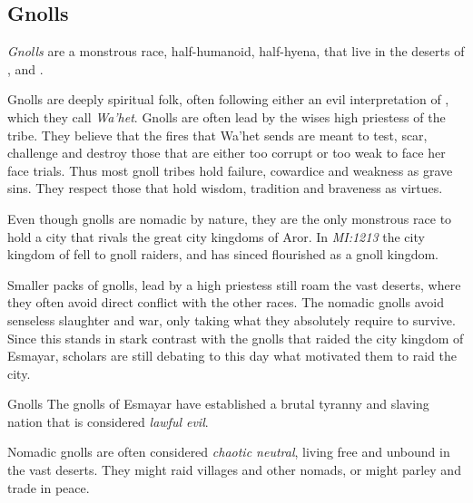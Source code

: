 \subsection{Gnolls}
\label{sec:Gnolls}

\emph{Gnolls} are a monstrous race, half-humanoid, half-hyena, that live in the
deserts of , and .

Gnolls are deeply spiritual folk, often following either an evil interpretation
of , which they call \emph{Wa'het}. Gnolls are often lead by
the wises high priestess of the tribe. They believe that the fires that Wa'het
sends are meant to test, scar, challenge and destroy those that are either too
corrupt or too weak to face her face trials. Thus most gnoll tribes hold
failure, cowardice and weakness as grave sins. They respect those that hold
wisdom, tradition and braveness as virtues.

Even though gnolls are nomadic by nature, they are the only monstrous race to
hold a city that rivals the great city kingdoms of Aror. In \emph{MI:1213} the
city kingdom of  fell to gnoll raiders, and has sinced
flourished as a gnoll kingdom.

Smaller packs of gnolls, lead by a high priestess still roam the vast deserts,
where they often avoid direct conflict with the other races. The nomadic gnolls
avoid senseless slaughter and war, only taking what they absolutely require
to survive. Since this stands in stark contrast with the gnolls that raided
the city kingdom of Esmayar, scholars are still debating to this day what
motivated them to raid the city.

\begin{35e}{Gnolls}
  The gnolls of Esmayar have established a brutal tyranny and slaving nation
  that is considered \emph{lawful evil}.

  Nomadic gnolls are often considered \emph{chaotic neutral}, living free and
  unbound in the vast deserts. They might raid villages and other nomads, or
  might parley and trade in peace.
\end{35e}
